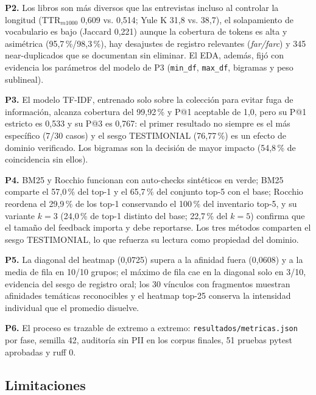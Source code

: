 \documentclass[11pt]{tg_usta}
\begin{document}
\textbf{P2.} Los libros son más diversos que las entrevistas incluso al controlar la longitud (TTR$_{m1000}$ 0,609 vs. 0,514; Yule K 31,8 vs. 38,7), el solapamiento de vocabulario es bajo (Jaccard 0,221) aunque la cobertura de tokens es alta y asimétrica (95,7\,\%/98,3\,\%), hay desajustes de registro relevantes (\textit{far/farc}) y 345 near-duplicados que se documentan sin eliminar. El EDA, además, fijó con evidencia los parámetros del modelo de P3 (\texttt{min\_df}, \texttt{max\_df}, bigramas y peso sublineal).

\textbf{P3.} El modelo TF-IDF, entrenado solo sobre la colección para evitar fuga de información, alcanza cobertura del 99,92\,\% y P@1 aceptable de 1,0, pero su P@1 estricto es 0,533 y su P@3 es 0,767: el primer resultado no siempre es el más específico (7/30 casos) y el sesgo TESTIMONIAL (76,77\,\%) es un efecto de dominio verificado. Los bigramas son la decisión de mayor impacto (54,8\,\% de coincidencia sin ellos).

\textbf{P4.} BM25 y Rocchio funcionan con auto-checks sintéticos en verde; BM25 comparte el 57,0\,\% del top-1 y el 65,7\,\% del conjunto top-5 con el base; Rocchio reordena el 29,9\,\% de los top-1 conservando el 100\,\% del inventario top-5, y su variante $k=3$ (24,0\,\% de top-1 distinto del base; 22,7\,\% del $k=5$) confirma que el tamaño del feedback importa y debe reportarse. Los tres métodos comparten el sesgo TESTIMONIAL, lo que refuerza su lectura como propiedad del dominio.

\textbf{P5.} La diagonal del heatmap (0,0725) supera a la afinidad fuera (0,0608) y a la media de fila en 10/10 grupos; el máximo de fila cae en la diagonal solo en 3/10, evidencia del sesgo de registro oral; los 30 vínculos con fragmentos muestran afinidades temáticas reconocibles y el heatmap top-25 conserva la intensidad individual que el promedio disuelve.

\textbf{P6.} El proceso es trazable de extremo a extremo: \texttt{resultados/metricas.json} por fase, semilla 42, auditoría sin PII en los corpus finales, 51 pruebas pytest aprobadas y ruff 0.

\subsection{Limitaciones}
\end{document}
